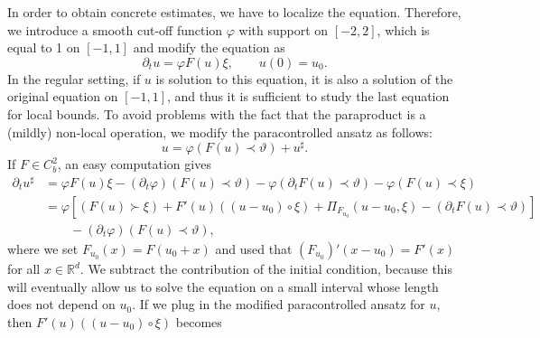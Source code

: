 \documentclass[11pt,a4paper]{article}
\theoremstyle{remark}
\newcommand{\R}{\mathbb{R}}
\begin{document}
In order to obtain concrete estimates,
we have to localize the equation. Therefore, we introduce a smooth cut-off
function $\varphi$ with support on $[ -2,2 ]$, which is equal to 1 on $[ -1,1]$ %
and modify the equation as
\[
   \partial_{t} u= \varphi F ( u ) \xi, \qquad u(0) = u_0.
\]
In the regular setting, if $u$ is solution to this equation, it is also a
solution of the original equation on $[ -1,1 ]$, and thus it is sufficient to
study the last equation for local bounds. To avoid problems with the fact
that the paraproduct is a (mildly) non-local operation, we modify the
paracontrolled ansatz as follows:
\begin{equation}\label{eq:ode paracontrolled ansatz localized}
   u= \varphi ( F ( u )\prec \vartheta ) +u^{\sharp}.
\end{equation}
If $F \in C^2_b$, an easy computation gives
\begin{align*}
   \partial_{t} u^{\sharp} & = \varphi F ( u ) \xi - ( \partial_{t} \varphi )  ( F ( u ) \prec \vartheta ) - \varphi  ( \partial_{t} F( u ) \prec \vartheta ) - \varphi ( F ( u ) \prec \xi )\\
   & = \varphi \left[ ( F ( u ) \succ \xi ) +F' ( u )  ( ( u-u_{0} ) \circ \xi ) + \Pi_{F_{u_{0}}} ( u-u_{0} , \xi ) - ( \partial_{t} F ( u ) \prec \vartheta ) \right] \\
   &\qquad - ( \partial_{t} \varphi )  ( F ( u ) \prec \vartheta ) ,
\end{align*}
where we set $F_{u_{0}} ( x ) =F ( u_{0} +x )$ and used that $( F_{u_{0}} )' (x-u_{0} ) =F' ( x )$ for all $x \in \R^d$. We subtract the contribution of the initial condition,
because this will eventually allow us to solve the equation on a small
interval whose length does not depend on $u_0$. If we plug in
the modified paracontrolled ansatz for $u$, then $F' ( u ) ( ( u-u_{0} ) \circ \xi )$ becomes
\end{document}
